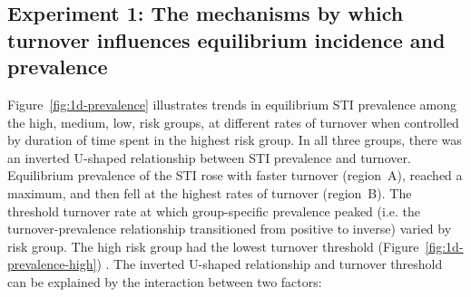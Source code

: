 \subsection{Experiment 1: The mechanisms by which turnover influences equilibrium incidence and prevalence}  %
\label{ss:res-prev-inc}
Figure~\ref{fig:1d-prevalence} illustrates trends in equilibrium STI prevalence  
among the high, medium, low, risk groups, at different rates of turnover when controlled by duration 
of time spent in the highest risk group.
In all three groups, there was an inverted U-shaped relationship between STI prevalence and turnover.
Equilibrium prevalence of the STI rose with faster turnover (region~A),
reached a maximum, and then fell at the highest rates of turnover (region~B). %
The threshold turnover rate at which group-specific prevalence peaked (i.e. the 
turnover-prevalence relationship transitioned from 
positive to inverse) varied by risk group. 
The high risk group had the lowest turnover threshold (Figure~\ref{fig:1d-prevalence-high}) .
The inverted U-shaped relationship and turnover threshold can be explained by the interaction between two factors:		%
